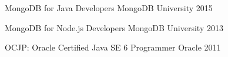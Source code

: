 
\begin{cvhonors}

  \cvhonor
    {MongoDB for Java Developers} %
    {MongoDB University} %
    {} %
    {2015} %
    
  \cvhonor
    {MongoDB for Node.js Developers} %
    {MongoDB University} %
    {} %
    {2013} %
    
  \cvhonor
    {OCJP: Oracle Certified Java SE 6 Programmer} %
    {Oracle} %
    {} %
    {2011} %

\end{cvhonors}
